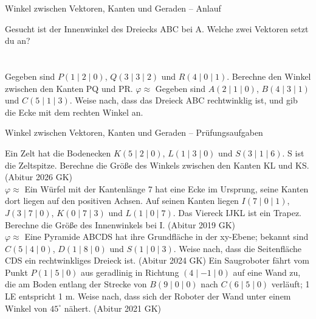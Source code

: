 \begin{aufgabe}{Winkel zwischen Vektoren, Kanten und Geraden – Anlauf}
\begin{teile}
\teil Gesucht ist der Innenwinkel des Dreiecks ABC bei A. Welche zwei Vektoren setzt du an? \\  \\  \\ 
\teil Gegeben sind $P(1 \mid 2 \mid 0)$, $Q(3 \mid 3 \mid 2)$ und $R(4 \mid 0 \mid 1)$. Berechne den Winkel zwischen den Kanten PQ und PR. $\varphi \approx$ \leerfeld[$^\circ$]
\teil Gegeben sind $A(2 \mid 1 \mid 0)$, $B(4 \mid 3 \mid 1)$ und $C(5 \mid 1 \mid 3)$. Weise nach, dass das Dreieck ABC rechtwinklig ist, und gib die Ecke mit dem rechten Winkel an.
\end{teile}
\end{aufgabe}

\begin{aufgabe}{Winkel zwischen Vektoren, Kanten und Geraden – Prüfungsaufgaben}
\begin{teile}
\teil Ein Zelt hat die Bodenecken $K(5 \mid 2 \mid 0)$, $L(1 \mid 3 \mid 0)$ und $S(3 \mid 1 \mid 6)$. S ist die Zeltspitze. Berechne die Größe des Winkels zwischen den Kanten KL und KS. \hfill (Abitur 2026 GK) \\ $\varphi \approx$ \leerfeld[$^\circ$]
\teil Ein Würfel mit der Kantenlänge 7 hat eine Ecke im Ursprung, seine Kanten dort liegen auf den positiven Achsen. Auf seinen Kanten liegen $I(7 \mid 0 \mid 1)$, $J(3 \mid 7 \mid 0)$, $K(0 \mid 7 \mid 3)$ und $L(1 \mid 0 \mid 7)$. Das Viereck IJKL ist ein Trapez. Berechne die Größe des Innenwinkels bei I. \hfill (Abitur 2019 GK) \\ $\varphi \approx$ \leerfeld[$^\circ$]
\teil Eine Pyramide ABCDS hat ihre Grundfläche in der xy-Ebene; bekannt sind $C(5 \mid 4 \mid 0)$, $D(1 \mid 8 \mid 0)$ und $S(1 \mid 0 \mid 3)$. Weise nach, dass die Seitenfläche CDS ein rechtwinkliges Dreieck ist. \hfill (Abitur 2024 GK)
\teil Ein Saugroboter fährt vom Punkt $P(1 \mid 5 \mid 0)$ aus geradlinig in Richtung $(4 \mid -1 \mid 0)$ auf eine Wand zu, die am Boden entlang der Strecke von $B(9 \mid 0 \mid 0)$ nach $C(6 \mid 5 \mid 0)$ verläuft; 1 LE entspricht 1 m. Weise nach, dass sich der Roboter der Wand unter einem Winkel von $45^\circ$ nähert. \hfill (Abitur 2021 GK)
\end{teile}
\end{aufgabe}

